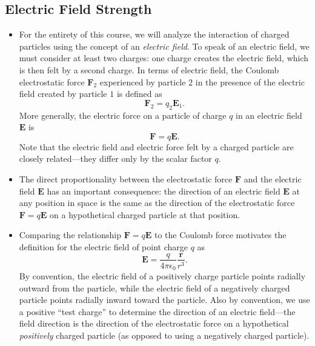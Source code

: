 \documentclass[11pt, a4paper]{article}
\renewcommand{\vec}[1]{\bm{#1}} %
\renewcommand{\r}{\vec{r}}
\newcommand{\E}{\vec{E}} %
\newcommand{\ee}{\epsilon_{0}}  %
\begin{document}
\subsection{Electric Field Strength}
\begin{itemize}

    \item For the entirety of this course, we will analyze the interaction of charged particles using the concept of an \textit{electric field}. To speak of an electric field, we must consider at least two charges: one charge creates the electric field, which is then felt by a second charge. In terms of electric field, the Coulomb electrostatic force $ \vec{F}_{2} $ experienced by particle 2 in the presence of the electric field created by particle $ 1 $ is defined as
    \begin{equation*}
        \vec{F}_{2} = q_{2} \E_{1}.
    \end{equation*}
    More generally, the electric force on a particle of charge $ q $ in an electric field $ \E $ is
    \begin{equation*}
        \vec{F} = q \E.
    \end{equation*}
    Note that the electric field and electric force felt by a charged particle are closely related---they differ only by the scalar factor $ q $. 

    \item The direct proportionality between the electrostatic force $ \vec{F} $ and the electric field $ \E $ has an important consequence: the direction of an electric field $ \E $ at any position in space is the same as the direction of the electrostatic force $ \vec{F} = q \E $ on a hypothetical charged particle at that position. 

    \item Comparing the relationship $ \vec{F} = q \E $ to the Coulomb force motivates the definition for the electric field of point charge $ q $  as
    \begin{equation*}
        \E = \frac{q}{4\pi \ee }\frac{\r}{r^{3}}.
    \end{equation*}
    By convention, the electric field of a positively charge particle points radially outward from the particle, while the electric field of a negatively charged particle points radially inward toward the particle. Also by convention, we use a positive ``test charge'' to determine the direction of an electric field---the field direction is the direction of the electrostatic force on a hypothetical \textit{positively} charged particle (as opposed to using a negatively charged particle).

\end{itemize}
\end{document}
